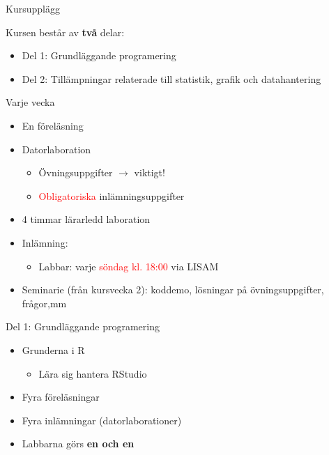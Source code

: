 \documentclass[
  10pt,
  ignorenonframetext,
]{beamer}
\providecommand{\tightlist}{%
  \setlength{\itemsep}{0pt}\setlength{\parskip}{0pt}}
\begin{document}

\begin{frame}{Kursupplägg}
\protect\hypertarget{kursuppluxe4gg}{}
\begin{block}{Kursen består av \textbf{två} delar:}
\protect\hypertarget{kursen-bestuxe5r-av-tvuxe5-delar}{}
\begin{itemize}
\tightlist
\item
  Del 1: Grundläggande programering
\item
  Del 2: Tillämpningar relaterade till statistik, grafik och
  datahantering
\end{itemize}

\pause
\end{block}

\begin{block}{Varje vecka}
\protect\hypertarget{varje-vecka}{}
\begin{itemize}
\tightlist
\item
  En föreläsning
\item Datorlaboration
  \begin{itemize}
        \item Övningsuppgifter $\rightarrow$ viktigt!
        \item \textcolor{red}{Obligatoriska} inlämningsuppgifter
  \end{itemize}
  
\item
  4 timmar lärarledd laboration
\item
  Inlämning:

  \begin{itemize}
  \tightlist
  \item
    Labbar: varje \textcolor{red}{söndag kl. 18:00} via LISAM
  \end{itemize}
\item
  Seminarie (från kursvecka 2): koddemo, lösningar på övningsuppgifter, frågor,mm

\end{itemize}
\end{block}
\end{frame}


\begin{frame}{Del 1: Grundläggande programering}
\protect\hypertarget{del-1-grundluxe4ggande-programering}{}
\begin{itemize}
\tightlist
\item
  Grunderna i R

  \begin{itemize}
  \tightlist
  \item
    Lära sig hantera RStudio
  \end{itemize}
\item
  Fyra föreläsningar
\item
  Fyra inlämningar (datorlaborationer)
\item
  Labbarna görs \textbf{en och en}
\end{itemize}
\end{frame}
\end{document}
